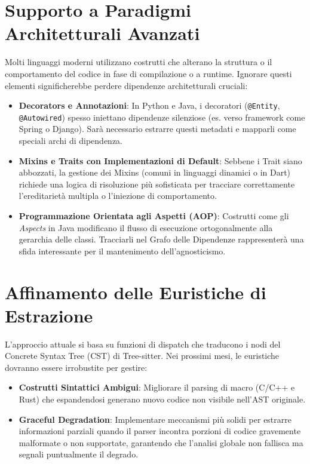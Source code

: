 \section{Supporto a Paradigmi Architetturali Avanzati}
Molti linguaggi moderni utilizzano costrutti che alterano la struttura o il comportamento del codice in fase di compilazione o a runtime. Ignorare questi elementi significherebbe perdere dipendenze architetturali cruciali:
\begin{itemize}
    \item \textbf{Decorators e Annotazioni}: In Python e Java, i decoratori (\texttt{@Entity}, \texttt{@Autowired}) spesso iniettano dipendenze silenziose (es. verso framework come Spring o Django). Sarà necessario estrarre questi metadati e mapparli come speciali archi di dipendenza.
    \item \textbf{Mixins e Traits con Implementazioni di Default}: Sebbene i Trait siano abbozzati, la gestione dei Mixins (comuni in linguaggi dinamici o in Dart) richiede una logica di risoluzione più sofisticata per tracciare correttamente l'ereditarietà multipla o l'iniezione di comportamento.
    \item \textbf{Programmazione Orientata agli Aspetti (AOP)}: Costrutti come gli \textit{Aspects} in Java modificano il flusso di esecuzione ortogonalmente alla gerarchia delle classi. Tracciarli nel Grafo delle Dipendenze rappresenterà una sfida interessante per il mantenimento dell'agnosticismo.
\end{itemize}

\section{Affinamento delle Euristiche di Estrazione}
L'approccio attuale si basa su funzioni di dispatch che traducono i nodi del Concrete Syntax Tree (CST) di Tree-sitter. Nei prossimi mesi, le euristiche dovranno essere irrobustite per gestire:
\begin{itemize}
    \item \textbf{Costrutti Sintattici Ambigui}: Migliorare il parsing di macro (C/C++ e Rust) che espandendosi generano nuovo codice non visibile nell'AST originale.
    \item \textbf{Graceful Degradation}: Implementare meccanismi più solidi per estrarre informazioni parziali quando il parser incontra porzioni di codice gravemente malformate o non supportate, garantendo che l'analisi globale non fallisca ma segnali puntualmente il degrado.
\end{itemize}

